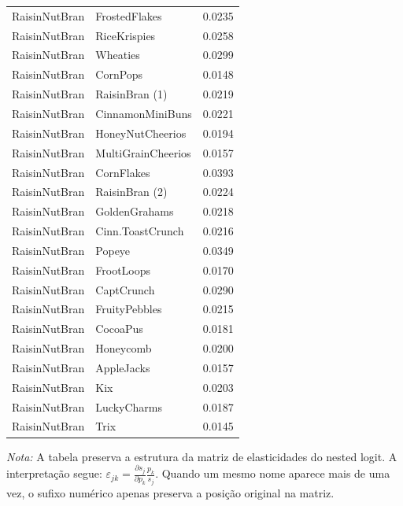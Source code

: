 \begin{table}[H]
\begin{tabular}{llr}
RaisinNutBran & FrostedFlakes & 0.0235 \\
RaisinNutBran & RiceKrispies & 0.0258 \\
RaisinNutBran & Wheaties & 0.0299 \\
RaisinNutBran & CornPops & 0.0148 \\
RaisinNutBran & RaisinBran (1) & 0.0219 \\
RaisinNutBran & CinnamonMiniBuns & 0.0221 \\
RaisinNutBran & HoneyNutCheerios & 0.0194 \\
RaisinNutBran & MultiGrainCheerios & 0.0157 \\
RaisinNutBran & CornFlakes & 0.0393 \\
RaisinNutBran & RaisinBran (2) & 0.0224 \\
RaisinNutBran & GoldenGrahams & 0.0218 \\
RaisinNutBran & Cinn.ToastCrunch & 0.0216 \\
RaisinNutBran & Popeye & 0.0349 \\
RaisinNutBran & FrootLoops & 0.0170 \\
RaisinNutBran & CaptCrunch & 0.0290 \\
RaisinNutBran & FruityPebbles & 0.0215 \\
RaisinNutBran & CocoaPus & 0.0181 \\
RaisinNutBran & Honeycomb & 0.0200 \\
RaisinNutBran & AppleJacks & 0.0157 \\
RaisinNutBran & Kix & 0.0203 \\
RaisinNutBran & LuckyCharms & 0.0187 \\
RaisinNutBran & Trix & 0.0145 \\
\bottomrule
\end{tabular}

\vspace{0.3em}
\footnotesize
\textit{Nota:} A tabela preserva a estrutura da matriz de elasticidades do nested logit. A interpretação segue: $\varepsilon_{jk}=\frac{\partial s_j}{\partial p_k}\frac{p_k}{s_j}$. Quando um mesmo nome aparece mais de uma vez, o sufixo numérico apenas preserva a posição original na matriz.
\end{table}
\endgroup


